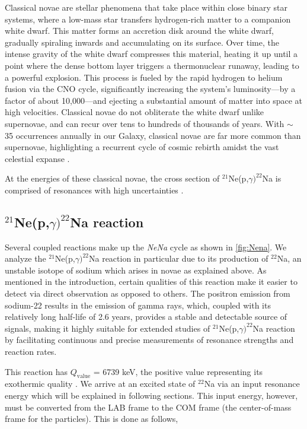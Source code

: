 \documentclass[a4paper,12pt]{article}
\def\reac{$^{21}$Ne(p,$\gamma)^{22}$Na reaction }
\begin{document}
    Classical novae are stellar phenomena that take place within close binary star systems, where a low-mass star transfers hydrogen-rich matter to a companion white dwarf. This matter forms an accretion disk around the white dwarf, gradually spiraling inwards and accumulating on its surface. Over time, the intense gravity of the white dwarf compresses this material, heating it up until a point where the dense bottom layer triggers a thermonuclear runaway, leading to a powerful explosion. This process is fueled by the rapid hydrogen to helium fusion via the CNO cycle, significantly increasing the system's luminosity—by a factor of about 10,000—and ejecting a substantial amount of matter into space at high velocities. Classical novae do not obliterate the white dwarf unlike supernovae, and can recur over tens to hundreds of thousands of years. With $\sim$ 35 occurrences annually in our Galaxy, classical novae are far more common than supernovae, highlighting a recurrent cycle of cosmic rebirth amidst the vast celestial expanse \cite{iliadis2015, boeltzig2016, masha2021}.

    At the energies of these classical novae, the cross section of $^{21}$Ne(p,$\gamma)^{22}$Na is comprised of resonances with high uncertainties \cite{chiara}. 

\subsection{$^{21}$Ne(p,$\gamma)^{22}$Na reaction}\label{reaction}

    Several coupled reactions make up the \textit{NeNa} cycle as shown in \ref{fig:Nena}.  We analyze the $^{21}$Ne(p,$\gamma)^{22}$Na reaction in particular due to its production of $^{22}$Na, an unstable isotope of sodium which arises in novae as explained above.  As mentioned in the introduction, certain qualities of this reaction make it easier to detect via direct observation as opposed to others.  The positron emission from sodium-22 results in the emission of gamma rays, which, coupled with its relatively long half-life of 2.6 years, provides a stable and detectable source of signals, making it highly suitable for extended studies of \reac by facilitating continuous and precise measurements of resonance strengths and reaction rates.  
    
    This reaction has $Q_{\text{value}}$ = 6739 keV, the positive value representing its exothermic quality \cite{krane1988}.  We arrive at an excited state of $^{22}$Na via an input resonance energy which will be explained in following sections.  This input energy, however, must be converted from the LAB frame to the COM frame (the center-of-mass frame for the particles).  This is done as follows,
\end{document}
